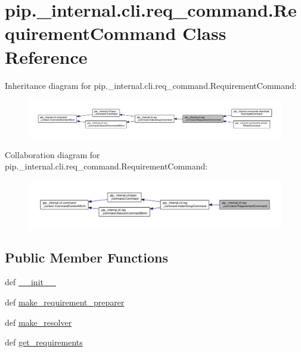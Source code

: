 \hypertarget{classpip_1_1__internal_1_1cli_1_1req__command_1_1RequirementCommand}{}\section{pip.\+\_\+internal.\+cli.\+req\+\_\+command.\+Requirement\+Command Class Reference}
\label{classpip_1_1__internal_1_1cli_1_1req__command_1_1RequirementCommand}


Inheritance diagram for pip.\+\_\+internal.\+cli.\+req\+\_\+command.\+Requirement\+Command\+:
\nopagebreak
\begin{figure}[H]
\begin{center}
\leavevmode
\includegraphics[width=350pt]{classpip_1_1__internal_1_1cli_1_1req__command_1_1RequirementCommand__inherit__graph}
\end{center}
\end{figure}


Collaboration diagram for pip.\+\_\+internal.\+cli.\+req\+\_\+command.\+Requirement\+Command\+:
\nopagebreak
\begin{figure}[H]
\begin{center}
\leavevmode
\includegraphics[width=350pt]{classpip_1_1__internal_1_1cli_1_1req__command_1_1RequirementCommand__coll__graph}
\end{center}
\end{figure}
\subsection*{Public Member Functions}
\begin{DoxyCompactItemize}
\item 
def \hyperlink{classpip_1_1__internal_1_1cli_1_1req__command_1_1RequirementCommand_aca41a8020126e2b743848fbe365ccf2d}{\+\_\+\+\_\+init\+\_\+\+\_\+}
\item 
def \hyperlink{classpip_1_1__internal_1_1cli_1_1req__command_1_1RequirementCommand_a4e49db0eec95f6c8758913641b873acd}{make\+\_\+requirement\+\_\+preparer}
\item 
def \hyperlink{classpip_1_1__internal_1_1cli_1_1req__command_1_1RequirementCommand_a0b0594eefb61922dbe32fb9059fc0491}{make\+\_\+resolver}
\item 
def \hyperlink{classpip_1_1__internal_1_1cli_1_1req__command_1_1RequirementCommand_a1d479089b6ddcde9c6f2068a48cf73f7}{get\+\_\+requirements}
\end{DoxyCompactItemize}
